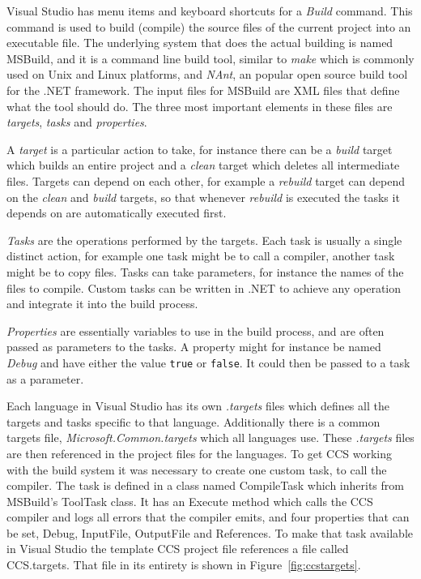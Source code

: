 	Visual Studio has menu items and keyboard shortcuts for a \textit{Build} 
	command. This command is used to build (compile) the source files of the 
	current project into an executable file. The underlying system that does the 
	actual building is named MSBuild, and it is a command line build tool, 
	similar to \textit{make} which is commonly used on Unix and Linux platforms, 
	and \textit{NAnt}, an popular open source build tool for the .NET framework. 
	The input files for MSBuild are XML files that define what the tool should 
	do. The three most important elements in these files are \textit{targets}, 
	\textit{tasks} and \textit{properties}. 
	
	A \textit{target} is a particular action to take, for instance there can be 
	a \textit{build} target which builds an entire project and a \textit{clean} 
	target which deletes all intermediate files. Targets can depend on each 
	other, for example a \textit{rebuild} target can depend on the 
	\textit{clean} and \textit{build} targets, so that whenever \textit{rebuild} 
	is executed the tasks it depends on are automatically executed first. 
		
	\textit{Tasks} are the operations performed by the targets. Each task is 
	usually a single distinct action, for example one task might be to call a 
	compiler, another task might be to copy files. Tasks can take parameters, 
	for instance the names of the files to compile. Custom tasks can be written 
	in .NET to achieve any operation and integrate it into the build process.
	
	\textit{Properties} are essentially variables to use in the build process, 
	and are often passed as parameters to the tasks. A property might for 
	instance be named \textit{Debug} and have either the value \texttt{true} or 
	\texttt{false}. It could then be passed to a task as a parameter.
	
	Each language in Visual Studio has its own \textit{.targets} files which 
	defines all the targets and tasks specific to that language. Additionally 
	there is a common targets file, \textit{Microsoft.Common.targets} which all 
	languages use. These \textit{.targets} files are then referenced in the 
	project files for the languages. To get CCS working with the build system it 
	was necessary to create one custom task, to call the compiler. The task is 
	defined in a class named \textsf{CompileTask} which inherits from MSBuild's 
	\textsf{ToolTask} class. It has an \textsf{Execute} method which calls the 
	CCS compiler and logs all errors that the compiler emits, and four 
	properties that can be set, \textsf{Debug}, \textsf{InputFile}, 
	\textsf{OutputFile} and \textsf{References}. To make that task available in 
	Visual Studio the template CCS project file references a file called 
	\textsf{CCS.targets}. That file in its entirety is shown in 
	Figure~\ref{fig:ccstargets}.
	
